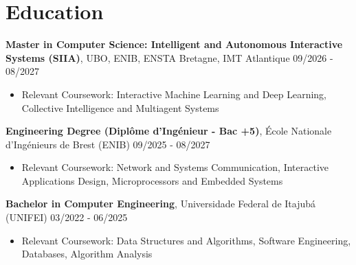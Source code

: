 \documentclass[10pt,a4paper]{article}
\begin{document}
\section{Education}
\noindent
\textbf{\color{primary} Master in Computer Science: Intelligent and Autonomous Interactive Systems (SIIA)}, UBO, ENIB, ENSTA Bretagne, IMT Atlantique \hfill {\small\color{subtext} 09/2026 - 08/2027}
\begin{itemize}
    \item \small Relevant Coursework: Interactive Machine Learning and Deep Learning, Collective Intelligence and Multiagent Systems
\end{itemize}
\noindent
\textbf{\color{primary} Engineering Degree (Diplôme d'Ingénieur - Bac +5)}, École Nationale d'Ingénieurs de Brest (ENIB) \hfill {\small\color{subtext} 09/2025 - 08/2027}
\begin{itemize}
    \item \small Relevant Coursework: Network and Systems Communication, Interactive Applications Design, Microprocessors and Embedded Systems
\end{itemize}
\noindent
\textbf{\color{primary} Bachelor in Computer Engineering}, Universidade Federal de Itajubá (UNIFEI) \hfill {\small\color{subtext} 03/2022 - 06/2025}
\begin{itemize}
    \item \small Relevant Coursework: Data Structures and Algorithms, Software Engineering, Databases, Algorithm Analysis
\end{itemize}

\end{document}
